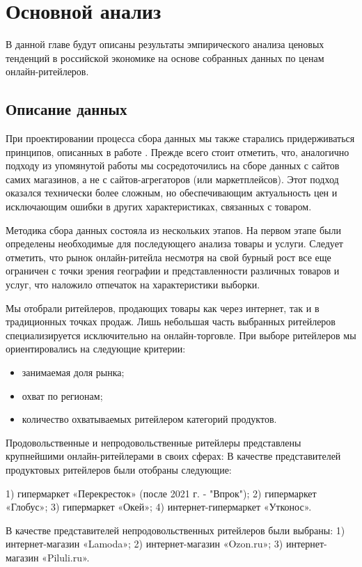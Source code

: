 \chapter{Основной анализ}\label{ch:ch3}

В данной главе будут описаны результаты эмпирического анализа ценовых тенденций в российской экономике на основе собранных данных по ценам онлайн-ритейлеров.

\section{Описание данных}\label{sec:ch3/sec1}

При проектировании процесса сбора данных мы также старались придерживаться принципов, описанных в работе \cite{cavallo2016billion}. Прежде всего стоит отметить, что, аналогично подходу из упомянутой работы мы сосредоточились на сборе данных с сайтов самих магазинов, а не с сайтов-агрегаторов (или маркетплейсов). Этот подход оказался технически более сложным, но обеспечивающим актуальность цен и исключающим ошибки в других характеристиках, связанных с товаром.

Методика сбора данных состояла из нескольких этапов. На первом этапе были определены необходимые для последующего анализа товары и услуги. Следует отметить, что рынок онлайн-ритейла несмотря на свой бурный рост все еще ограничен с точки зрения географии и представленности различных товаров и услуг, что наложило отпечаток на характеристики выборки.

Мы отобрали ритейлеров, продающих товары как через интернет, так и в традиционных точках продаж. Лишь небольшая часть выбранных ритейлеров специализируется исключительно на онлайн-торговле. При выборе ритейлеров мы ориентировались на следующие критерии:
\begin{itemize}
	\item занимаемая доля рынка;
	\item охват по регионам;
	\item количество охватываемых ритейлером категорий продуктов.
\end{itemize}
Продовольственные и непродовольственные ритейлеры представлены крупнейшими онлайн-ритейлерами в своих сферах:
В качестве представителей продуктовых ритейлеров были отобраны следующие:

1) гипермаркет «Перекресток» (после 2021 г. - "Впрок");
2) гипермаркет «Глобус»;
3) гипермаркет «Окей»;
4) интернет-гипермаркет «Утконос».

В качестве представителей непродовольственных ритейлеров были выбраны:
1) интернет-магазин «Lamoda»;
2) интернет-магазин «Ozon.ru»;
3) интернет-магазин «Piluli.ru».

